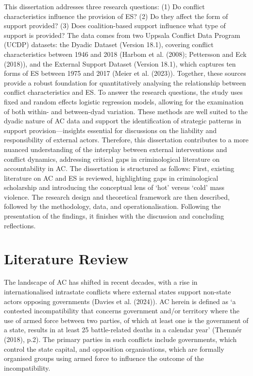 \documentclass[
]{article}
\begin{document}
This dissertation addresses three research questions: (1) Do conflict
characteristics influence the provision of ES? (2) Do they affect the
form of support provided? (3) Does coalition-based support influence
what type of support is provided? The data comes from two Uppsala
Conflict Data Program (UCDP) datasets: the Dyadic Dataset (Version
18.1), covering conflict characteristics between 1946 and 2018 (Harbom
et al. (2008); Pettersson and Eck (2018)), and the External Support
Dataset (Version 18.1), which captures ten forms of ES between 1975 and
2017 (Meier et al. (2023)). Together, these sources provide a robust
foundation for quantitatively analysing the relationship between
conflict characteristics and ES. To answer the research questions, the
study uses fixed and random effects logistic regression models, allowing
for the examination of both within- and between-dyad variation. These
methods are well suited to the dyadic nature of AC data and support the
identification of strategic patterns in support provision---insights
essential for discussions on the liability and responsibility of
external actors. Therefore, this dissertation contributes to a more
nuanced understanding of the interplay between external interventions
and conflict dynamics, addressing critical gaps in criminological
literature on accountability in AC. The dissertation is structured as
follows: First, existing literature on AC and ES is reviewed,
highlighting gaps in criminological scholarship and introducing the
conceptual lens of `hot' versus `cold' mass violence. The research
design and theoretical framework are then described, followed by the
methodology, data, and operationalisation. Following the presentation of
the findings, it finishes with the discussion and concluding
reflections.

\section{Literature Review}\label{literature-review}

The landscape of AC has shifted in recent decades, with a rise in
internationalised intrastate conflicts where external states support
non-state actors opposing governments (Davies et al. (2024)). AC herein
is defined as `a contested incompatibility that concerns government
and/or territory where the use of armed force between two parties, of
which at least one is the government of a state, results in at least 25
battle-related deaths in a calendar year' (Themnér (2018), p.2). The
primary parties in such conflicts include governments, which control the
state capital, and opposition organisations, which are formally
organised groups using armed force to influence the outcome of the
incompatibility.
\end{document}

